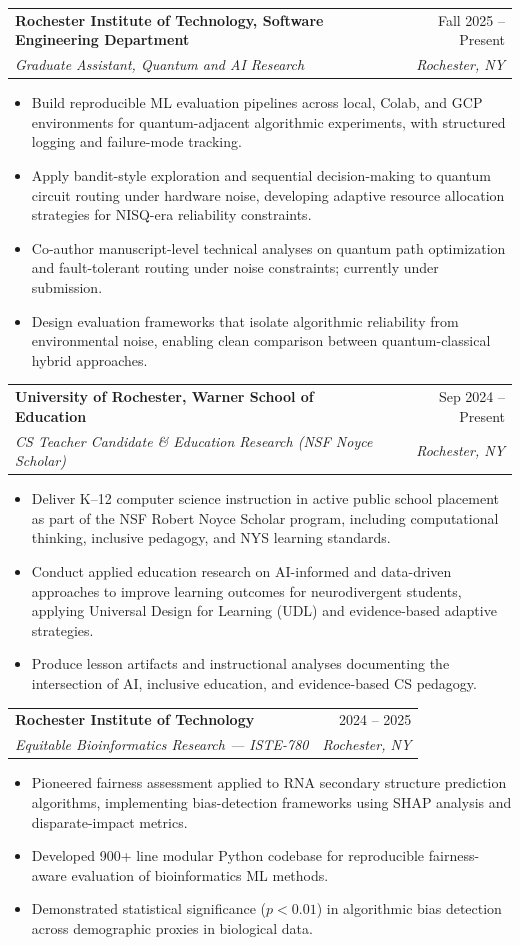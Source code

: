\documentclass[11pt]{article}
\makeatletter
\newcommand{\entry}[4]{
  \noindent\begin{tabularx}{\textwidth}{@{}Xr@{}}
    \textbf{#1} & #2 \\
    \textit{#3} & \textit{#4}
  \end{tabularx}\vspace{2pt}
}
\makeatother
\begin{document}
\entry{Rochester Institute of Technology, Software Engineering Department}{Fall 2025 -- Present}{Graduate Assistant, Quantum and AI Research}{Rochester, NY}
\begin{itemize}
  \item Build reproducible ML evaluation pipelines across local, Colab, and GCP environments for quantum-adjacent algorithmic experiments, with structured logging and failure-mode tracking.
  \item Apply bandit-style exploration and sequential decision-making to quantum circuit routing under hardware noise, developing adaptive resource allocation strategies for NISQ-era reliability constraints.
  \item Co-author manuscript-level technical analyses on quantum path optimization and fault-tolerant routing under noise constraints; currently under submission.
  \item Design evaluation frameworks that isolate algorithmic reliability from environmental noise, enabling clean comparison between quantum-classical hybrid approaches.
\end{itemize}

\entry{University of Rochester, Warner School of Education}{Sep 2024 -- Present}{CS Teacher Candidate \& Education Research (NSF Noyce Scholar)}{Rochester, NY}
\begin{itemize}
  \item Deliver K--12 computer science instruction in active public school placement as part of the NSF Robert Noyce Scholar program, including computational thinking, inclusive pedagogy, and NYS learning standards.
  \item Conduct applied education research on AI-informed and data-driven approaches to improve learning outcomes for neurodivergent students, applying Universal Design for Learning (UDL) and evidence-based adaptive strategies.
  \item Produce lesson artifacts and instructional analyses documenting the intersection of AI, inclusive education, and evidence-based CS pedagogy.
\end{itemize}

\entry{Rochester Institute of Technology}{2024 -- 2025}{Equitable Bioinformatics Research --- ISTE-780}{Rochester, NY}
\begin{itemize}
  \item Pioneered fairness assessment applied to RNA secondary structure prediction algorithms, implementing bias-detection frameworks using SHAP analysis and disparate-impact metrics.
  \item Developed 900+ line modular Python codebase for reproducible fairness-aware evaluation of bioinformatics ML methods.
  \item Demonstrated statistical significance ($p < 0.01$) in algorithmic bias detection across demographic proxies in biological data.
\end{itemize}
\end{document}
